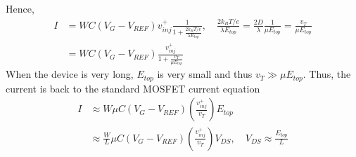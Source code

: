 \begin{equation}
\end{equation} Hence, \begin{align}
    I& = WC(V_{G}-V_{REF})v_{inj}^{+}\frac{1}{1+\frac{2k_{B}T/e}{\lambda E_{top}}},\quad \frac{2k_{B}T/e}{\lambda E_{top}}=\frac{2D}{\lambda}\frac{1}{\mu E_{top}} = \frac{v_{T}}{\mu E_{top}}\nonumber\\
    & = WC(V_{G}-V_{REF})\frac{v_{inj}^{+}}{1+\frac{v_{T}}{\mu E_{top}}}
\end{align} When the device is very long, $E_{top}$ is very small and thus $v_{T}\gg\mu E_{top}$. Thus, the current is back to the standard MOSFET current equation \begin{align}
    I& \approx W\mu C(V_{G}-V_{REF})\left(\frac{v_{inj}^{+}}{v_{T}}\right)E_{top}\nonumber\\
    & \approx \frac{W}{L}\mu C(V_{G}-V_{REF})\left(\frac{v_{inj}^{+}}{v_{T}}\right)V_{DS},\quad V_{DS} \approx \frac{E_{top}}{L}
\end{align}
